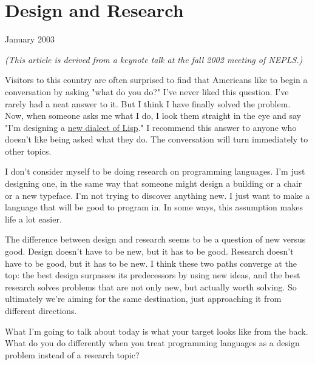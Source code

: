 \chapter{Design and Research}


            
              
                

January 2003

\emph{(This article is derived from a keynote talk at the fall
                    2002 meeting of NEPLS.)}

Visitors to this country are often surprised to
                  find that Americans like to begin a conversation by asking
                  "what do you do?" I've never liked this question. I've rarely
                  had a neat answer to it. But I think I have finally solved the
                  problem. Now, when someone asks me what I do, I look them
                  straight in the eye and say "I'm designing a
                  \href{http://www.paulgraham.com/arc.html}{new dialect of Lisp}." I recommend this
                  answer to anyone who doesn't like being asked what they do.
                  The conversation will turn immediately to other topics.

I
                  don't consider myself to be doing research on programming
                  languages. I'm just designing one, in the same way that
                  someone might design a building or a chair or a new typeface.
                  I'm not trying to discover anything new. I just want to make a
                  language that will be good to program in. In some ways, this
                  assumption makes life a lot easier.

The difference
                  between design and research seems to be a question of new
                  versus good. Design doesn't have to be new, but it has to be
                  good. Research doesn't have to be good, but it has to be new.
                  I think these two paths converge at the top: the best design
                  surpasses its predecessors by using new ideas, and the best
                  research solves problems that are not only new, but actually
                  worth solving. So ultimately we're aiming for the same
                  destination, just approaching it from different directions.

What
                  I'm going to talk about today is what your target looks like
                  from the back. What do you do differently when you treat
                  programming languages as a design problem instead of a
                  research topic?



